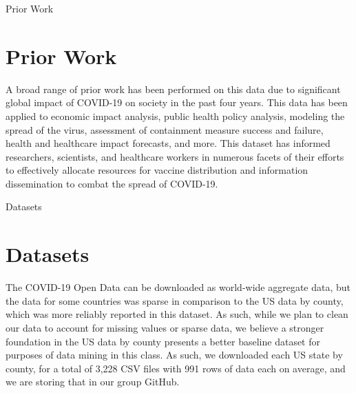 \documentclass{beamer}
\begin{document}
\begin{frame}[fragile]{Prior Work}

\section{Prior Work} %
A broad range of prior work has been performed on this data due to significant global impact of COVID-19 on society in the past four years. This data has been applied to economic impact analysis, public health policy analysis, modeling the spread of the virus, assessment of containment measure success and failure, health and healthcare impact forecasts, and more. This dataset has informed researchers, scientists, and healthcare workers in numerous facets of their efforts to effectively allocate resources for vaccine distribution and information dissemination to combat the spread of COVID-19.
\end{frame}


\begin{frame}[fragile]{Datasets}
\section{Datasets} 
The COVID-19 Open Data can be downloaded as world-wide aggregate data, but the data for some countries was sparse in comparison to the US data by county, which was more reliably reported in this dataset. As such, while we plan to clean our data to account for missing values or sparse data, we believe a stronger foundation in the US data by county presents a better baseline dataset for purposes of data mining in this class. As such, we downloaded each US state by county, for a total of 3,228 CSV files with 991 rows of data each on average, and we are storing that in our group GitHub.
\end{frame}

\end{document}

